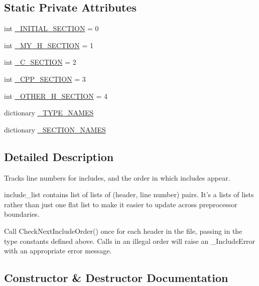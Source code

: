 \subsection*{Static Private Attributes}
\begin{DoxyCompactItemize}
\item 
int \hyperlink{classcpplint_1_1__IncludeState_a91a5a4add6ae053f4ef6ac19943d40fb}{\+\_\+\+I\+N\+I\+T\+I\+A\+L\+\_\+\+S\+E\+C\+T\+I\+ON} = 0
\item 
int \hyperlink{classcpplint_1_1__IncludeState_ac594f53b34c2b7303350638247b13812}{\+\_\+\+M\+Y\+\_\+\+H\+\_\+\+S\+E\+C\+T\+I\+ON} = 1
\item 
int \hyperlink{classcpplint_1_1__IncludeState_a6f0cd97b110703aaebde37a726e6667d}{\+\_\+\+C\+\_\+\+S\+E\+C\+T\+I\+ON} = 2
\item 
int \hyperlink{classcpplint_1_1__IncludeState_a02d92497eead44f258fbd11aee7825f7}{\+\_\+\+C\+P\+P\+\_\+\+S\+E\+C\+T\+I\+ON} = 3
\item 
int \hyperlink{classcpplint_1_1__IncludeState_a61762d0c9aa19bcfcea686d6d77d33d1}{\+\_\+\+O\+T\+H\+E\+R\+\_\+\+H\+\_\+\+S\+E\+C\+T\+I\+ON} = 4
\item 
dictionary \hyperlink{classcpplint_1_1__IncludeState_a30443aeeaee48abde90a4cf63e6ebda7}{\+\_\+\+T\+Y\+P\+E\+\_\+\+N\+A\+M\+ES}
\item 
dictionary \hyperlink{classcpplint_1_1__IncludeState_af6d3c191f07229558c87b3327e274714}{\+\_\+\+S\+E\+C\+T\+I\+O\+N\+\_\+\+N\+A\+M\+ES}
\end{DoxyCompactItemize}


\subsection{Detailed Description}
\begin{DoxyVerb}Tracks line numbers for includes, and the order in which includes appear.

include_list contains list of lists of (header, line number) pairs.
It's a lists of lists rather than just one flat list to make it
easier to update across preprocessor boundaries.

Call CheckNextIncludeOrder() once for each header in the file, passing
in the type constants defined above. Calls in an illegal order will
raise an _IncludeError with an appropriate error message.\end{DoxyVerb}
 

\subsection{Constructor \& Destructor Documentation}
